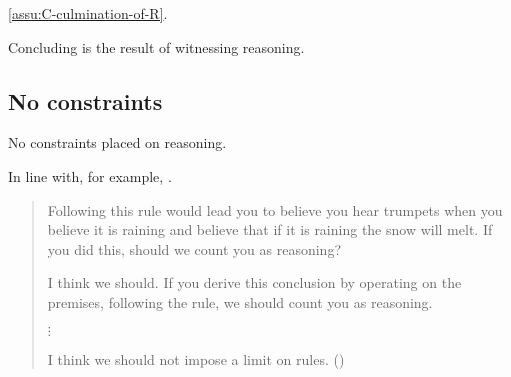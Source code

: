\begin{note}
  \autoref{assu:C-culmination-of-R}.

  Concluding is the result of witnessing reasoning.
\end{note}

\subsection{No constraints}

\begin{note}[No constraints]
  No constraints placed on reasoning.

  In line with, for example, \citeauthor{Broome:2013aa}.

  \begin{quote}
    Following this rule would lead you to believe you hear trumpets when you believe it is raining and believe that if it is raining the snow will melt. If you did this, should we count you as reasoning?

    I think we should. If you derive this conclusion by operating on the premises, following the rule, we should count you as reasoning.

    \mbox{}\hfill\(\vdots\)\hfill\mbox{}

    I think we should not impose a limit on rules.%
    \mbox{}\hfill\mbox{(\citeyear[233]{Broome:2013aa})}
  \end{quote}
\end{note}

